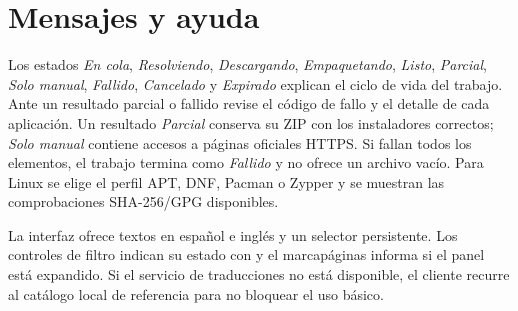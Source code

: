 \section{Mensajes y ayuda}

Los estados \emph{En cola}, \emph{Resolviendo}, \emph{Descargando}, \emph{Empaquetando}, \emph{Listo}, \emph{Parcial}, \emph{Solo manual}, \emph{Fallido}, \emph{Cancelado} y \emph{Expirado} explican el ciclo de vida del trabajo. Ante un resultado parcial o fallido revise el código de fallo y el detalle de cada aplicación. Un resultado \emph{Parcial} conserva su ZIP con los instaladores correctos; \emph{Solo manual} contiene accesos  a páginas oficiales HTTPS. Si fallan todos los elementos, el trabajo termina como \emph{Fallido} y no ofrece un archivo vacío. Para Linux se elige el perfil APT, DNF, Pacman o Zypper y se muestran las comprobaciones SHA-256/GPG disponibles.

La interfaz ofrece textos en español e inglés y un selector persistente. Los controles de filtro indican su estado con  y el marcapáginas informa si el panel está expandido. Si el servicio de traducciones no está disponible, el cliente recurre al catálogo local de referencia para no bloquear el uso básico.
